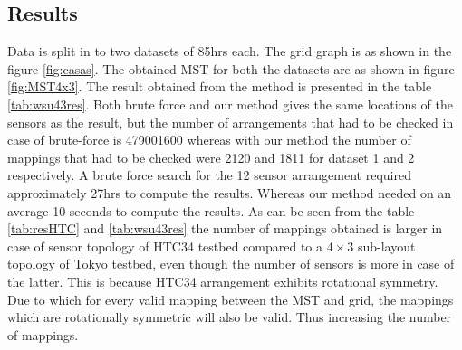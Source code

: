 \subsection{Results}
Data is split in to two datasets of 85hrs each. The grid graph is as shown in the figure \ref{fig:casas}. The obtained MST for both the datasets are as shown in figure \ref{fig:MST4x3}. The result obtained from the method is presented in the table \ref{tab:wsu43res}. Both brute force and our method gives the same locations of the sensors as the result, but the number of arrangements that had to be checked in case of brute-force is 479001600 whereas with our method the number of mappings that had to be checked were 2120 and 1811 for dataset 1 and 2 respectively. A brute force search for the 12 sensor arrangement required approximately 27hrs to compute the results. Whereas our method needed on an average 10 seconds to compute the results. As can be seen from the table \ref{tab:resHTC} and \ref{tab:wsu43res} the number of mappings obtained is larger in case of sensor topology of HTC34 testbed compared to a $4 \times 3$ sub-layout topology of Tokyo testbed, even though the number of sensors is more in case of the latter. This is because HTC34 arrangement exhibits rotational symmetry. Due to which for every valid mapping between the MST and grid, the mappings which are rotationally symmetric will also be valid. Thus increasing the number of mappings.
